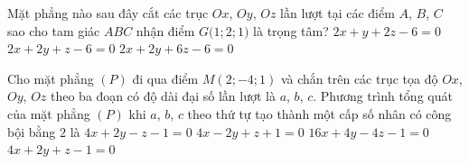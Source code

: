 \begin{ex}%
	Mặt phẳng nào sau đây cắt các trục $Ox$, $Oy$, $Oz$ lần lượt tại các điểm $A$, $B$, $C$ sao cho tam giác $ABC$ nhận điểm $G\big(1; 2; 1\big)$ là trọng tâm?
	{\True $2x + y + 2z  - 6 = 0$}
	{$2x + 2y + z  - 6 = 0$}
	{$2x + 2y + 6z - 6 = 0$} 
\end{ex}
\begin{ex}%
	Cho mặt phẳng  $\left(P\right)$ đi qua điểm $M\left(2; - 4; 1\right)$  và chắn trên các trục tọa độ $Ox$, $Oy$, $Oz$ theo ba đoạn có độ dài đại số lần lượt là $a$, $b$, $c$. Phương trình tổng quát của mặt phẳng $\left(P\right)$ khi $a$, $b$, $c$ theo thứ tự tạo thành một cấp số nhân có công bội bằng $2$ là 
	\choice
	{$4x + 2y - z - 1 = 0$}
	{$4x -  2y + z +  1 = 0$}
	{$16x + 4y - 4z - 1 = 0$}
	{\True $4x + 2y +  z - 1 = 0$}
\end{ex}

